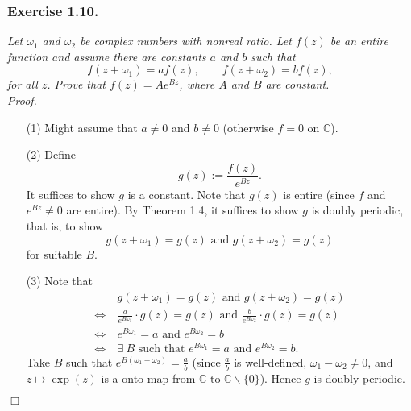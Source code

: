 \documentclass{article}
\begin{document}



\subsubsection*{Exercise 1.10.}
\emph{Let $\omega_1$ and $\omega_2$ be complex numbers with nonreal ratio.
Let $f(z)$ be an entire function and assume there are constants $a$ and $b$ such that
\[
  f(z+\omega_1) = af(z), \qquad f(z+\omega_2) = bf(z),
\]
for all $z$.
Prove that $f(z) = A e^{Bz}$, where $A$ and $B$ are constant.} \\



\emph{Proof.}
\begin{enumerate}
\item[(1)]
  Might assume that $a \neq 0$ and $b \neq 0$
  (otherwise $f = 0$ on $\mathbb{C}$).

\item[(2)]
  Define
  \[
    g(z) := \frac{f(z)}{e^{Bz}}.
  \]
  It suffices to show $g$ is a constant.
  Note that $g(z)$ is entire (since $f$ and $e^{Bz} \neq 0$ are entire).
  By Theorem 1.4, it suffices to show $g$ is doubly periodic, that is,
  to show
  \[
    g(z+\omega_1) = g(z) \text{ and } g(z+\omega_2) = g(z)
  \]
  for suitable $B$.

\item[(3)]
  Note that
  \begin{align*}
    &\:
    g(z+\omega_1) = g(z) \text{ and } g(z+\omega_2) = g(z) \\
    \Longleftrightarrow & \:
    \frac{a}{e^{B\omega_1}} \cdot g(z) = g(z)
      \text{ and } \frac{b}{e^{B\omega_2}} \cdot g(z) = g(z) \\
    \Longleftrightarrow & \:
    e^{B\omega_1} = a \text{ and } e^{B\omega_2} = b \\
    \Longleftrightarrow & \:
    \text{$\exists \: B$ such that $e^{B\omega_1} = a$ and $e^{B\omega_2} = b$}.
  \end{align*}
  Take $B$ such that $e^{B(\omega_1 - \omega_2)} = \frac{a}{b}$
  (since $\frac{a}{b}$ is well-defined, $\omega_1 - \omega_2 \neq 0$,
  and $z \mapsto \exp(z)$ is a onto map from $\mathbb{C}$ to $\mathbb{C} \smallsetminus \{0\}$).
  Hence $g$ is doubly periodic.
\end{enumerate}
$\Box$ \\\\
\end{document}
